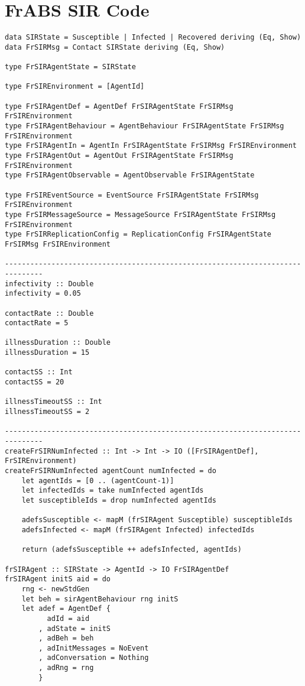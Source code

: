 \section{FrABS SIR Code}

\begin{verbatim}
data SIRState = Susceptible | Infected | Recovered deriving (Eq, Show)
data FrSIRMsg = Contact SIRState deriving (Eq, Show)

type FrSIRAgentState = SIRState

type FrSIREnvironment = [AgentId]

type FrSIRAgentDef = AgentDef FrSIRAgentState FrSIRMsg FrSIREnvironment
type FrSIRAgentBehaviour = AgentBehaviour FrSIRAgentState FrSIRMsg FrSIREnvironment
type FrSIRAgentIn = AgentIn FrSIRAgentState FrSIRMsg FrSIREnvironment
type FrSIRAgentOut = AgentOut FrSIRAgentState FrSIRMsg FrSIREnvironment
type FrSIRAgentObservable = AgentObservable FrSIRAgentState

type FrSIREventSource = EventSource FrSIRAgentState FrSIRMsg FrSIREnvironment
type FrSIRMessageSource = MessageSource FrSIRAgentState FrSIRMsg FrSIREnvironment
type FrSIRReplicationConfig = ReplicationConfig FrSIRAgentState FrSIRMsg FrSIREnvironment

-------------------------------------------------------------------------------
infectivity :: Double
infectivity = 0.05

contactRate :: Double
contactRate = 5

illnessDuration :: Double
illnessDuration = 15

contactSS :: Int
contactSS = 20

illnessTimeoutSS :: Int
illnessTimeoutSS = 2

-------------------------------------------------------------------------------
createFrSIRNumInfected :: Int -> Int -> IO ([FrSIRAgentDef], FrSIREnvironment)
createFrSIRNumInfected agentCount numInfected = do
    let agentIds = [0 .. (agentCount-1)]
    let infectedIds = take numInfected agentIds
    let susceptibleIds = drop numInfected agentIds

    adefsSusceptible <- mapM (frSIRAgent Susceptible) susceptibleIds
    adefsInfected <- mapM (frSIRAgent Infected) infectedIds

    return (adefsSusceptible ++ adefsInfected, agentIds)

frSIRAgent :: SIRState -> AgentId -> IO FrSIRAgentDef
frSIRAgent initS aid = do
    rng <- newStdGen
    let beh = sirAgentBehaviour rng initS
    let adef = AgentDef { 
          adId = aid
        , adState = initS
        , adBeh = beh
        , adInitMessages = NoEvent
        , adConversation = Nothing
        , adRng = rng 
        }


\end{verbatim}
